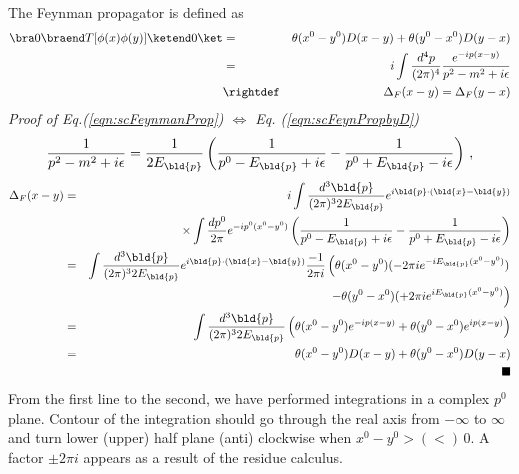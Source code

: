 The Feynman propagator is defined as
\begin{eqnarray}
\bra 0 \braend T[\phi(x) \phi(y)] \ketend 0 \ket
&=&
\theta(x^0 - y^0) D(x-y)
+
\theta(y^0 - x^0) D(y-x)
\label{eqn:scFeynPropbyD}
\\
&=&
i \int \frac{d^4 p}{(2\pi)^4}
\frac{e^{-ip (x-y)}}{p^2 - m^2 + i\epsilon}
\label{eqn:scFeynmanProp}
\\
&\rightdef&
\Delta_F(x-y)
=
\Delta_F(y-x)
\nonumber
\label{eqn:FeynmanPropDefSc}
\end{eqnarray}
{\it Proof of Eq.(\ref{eqn:scFeynmanProp}) $\Leftrightarrow$ Eq. (\ref{eqn:scFeynPropbyD})}\\
\begin{eqnarray}
\frac{1}{p^2 - m^2 + i\epsilon}
=
\frac{1}{2 E_{\bld{p}}} \left(
\frac{1}{p^0 - E_{\bld{p}} + i\epsilon}
-
\frac{1}{p^0 + E_{\bld{p}} - i\epsilon}
\right)
\,,
\end{eqnarray}
\begin{eqnarray}
\Delta_F(x-y)
&=&
i \int \frac{d^3 \bld{p}}{(2\pi)^3 2 E_{\bld{p}}} e^{i\bld{p}\cdot (\bld{x} - \bld{y})}
\nonumber\\
&&
\times \int \frac{d p^0}{2\pi} e^{- ip^0 (x^0 - y^0)}
\left(
\frac{1}{p^0 - E_{\bld{p}} + i\epsilon}
-
\frac{1}{p^0 + E_{\bld{p}} - i\epsilon}
\right)
\nonumber\\
&=&
\int \frac{d^3 \bld{p}}{(2\pi)^3 2 E_{\bld{p}}} e^{i\bld{p}\cdot (\bld{x} - \bld{y})}
\frac{-1}{2\pi i} \left(
\theta(x^0 - y^0) (-2\pi i e^{-i E_{\bld{p}}(x^0 - y^0)})
\right.
\nonumber\\
&&
\left.
-
\theta(y^0 - x^0) (+2\pi i e^{i E_{\bld{p}}(x^0 - y^0)}
\right)
\nonumber\\
&=&
\int \frac{d^3 \bld{p}}{(2\pi)^3 2 E_{\bld{p}}} 
\left(
\theta(x^0 - y^0) e^{-ip(x-y)}
+
\theta(y^0 - x^0) e^{i p(x-y)}
\right)
\nonumber\\
&=&
\theta(x^0 - y^0) D(x-y)
+
\theta(y^0 - x^0) D(y-x)
\nonumber\\
&& 
\hspace{65mm}
\blacksquare
\end{eqnarray}
From the first line to the second, we have performed integrations in a complex $p^0$ plane.
Contour of the integration should go through the real axis from $- \infty$ to $\infty$ and
turn lower (upper) half plane (anti) clockwise when $x^0 - y^0 > (<)\, 0$. A factor
$\pm 2\pi i$ appears as a result of the residue calculus.

